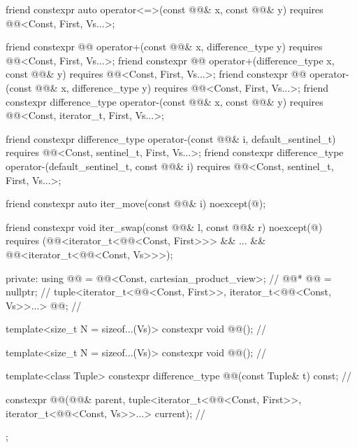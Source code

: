 \begin{codeblock}
{{    friend constexpr auto operator<=>(const @@& x, const @@& y)
      requires @@<Const, First, Vs...>;

    friend constexpr @@ operator+(const @@& x, difference_type y)
      requires @@<Const, First, Vs...>;
    friend constexpr @@ operator+(difference_type x, const @@& y)
      requires @@<Const, First, Vs...>;
    friend constexpr @@ operator-(const @@& x, difference_type y)
      requires @@<Const, First, Vs...>;
    friend constexpr difference_type operator-(const @@& x, const @@& y)
      requires @@<Const, iterator_t, First, Vs...>;

    friend constexpr difference_type operator-(const @@& i, default_sentinel_t)
      requires @@<Const, sentinel_t, First, Vs...>;
    friend constexpr difference_type operator-(default_sentinel_t, const @@& i)
      requires @@<Const, sentinel_t, First, Vs...>;

    friend constexpr auto iter_move(const @@& i) noexcept(@\seebelow@);

    friend constexpr void iter_swap(const @@& l, const @@& r) noexcept(@\seebelow@)
      requires (@@<iterator_t<@@<Const, First>>> && ... &&
        @@<iterator_t<@@<Const, Vs>>>);

  private:
    using @@ = @@<Const, cartesian_product_view>;          // \expos
    @@* @@ = nullptr;                                          // \expos
    tuple<iterator_t<@@<Const, First>>,
      iterator_t<@@<Const, Vs>>...> @@;                  // \expos

    template<size_t N = sizeof...(Vs)>
      constexpr void @@();                                            // \expos

    template<size_t N = sizeof...(Vs)>
      constexpr void @@();                                            // \expos

    template<class Tuple>
      constexpr difference_type @@(const Tuple& t) const;    // \expos

    constexpr @@(@@& parent, tuple<iterator_t<@@<Const, First>>,
      iterator_t<@@<Const, Vs>>...> current);                  // \expos
  };
}
\end{codeblock}

